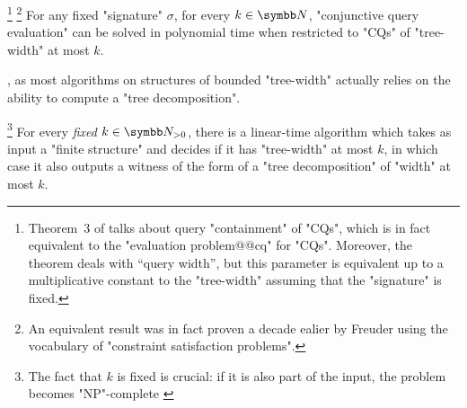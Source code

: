 \begin{proposition}
	\!\footnote{Theorem~3 of \cite{ChekuriRajaraman2000Containment} talks about query "containment" of "CQs", which is in fact equivalent
	to the "evaluation problem@@cq" for "CQs". Moreover, the theorem deals with ``query width'',
	but this parameter is equivalent up to a multiplicative constant to the "tree-width"
	\cite[Lemma~2]{ChekuriRajaraman2000Containment} assuming that the "signature" is fixed.}%
	\footnote{An equivalent result was in fact proven a decade ealier
	by Freuder \cite[Theorem~3]{Freuder1990Complexity} using the
	vocabulary of "constraint satisfaction problems".}
	\AP\label{prop:eval-CQ-bounded-tw}
	For any fixed "signature" $\sigma$,
	for every $k\in\N$, "conjunctive query evaluation" can
	be solved in polynomial time when restricted to "CQs" of
	"tree-width" at most $k$.
\end{proposition}

, as most algorithms on structures of
bounded "tree-width" actually relies on the ability to compute
a "tree decomposition".
\begin{proposition}
	\!\footnote{The fact that $k$ is fixed is crucial: if it is also
	part of the input, the problem becomes "NP"-complete
	\cite[Theorem~3.3]{ArnborgCorneilProskurowski1987Complexity}}
	\label{prop:bodlaender}
	For every \emph{fixed} $k\in\Np$, there is a linear-time algorithm
	which takes as input a "finite structure" and decides
	if it has "tree-width" at most $k$, in which case it also
	outputs a witness of the form of a "tree decomposition" of "width" at most $k$. 
\end{proposition}

